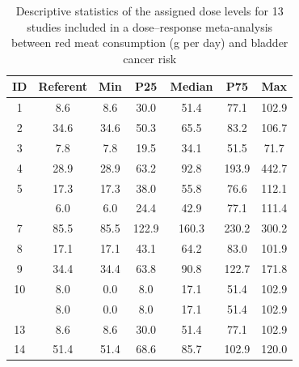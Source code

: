 \documentclass[11pt,a4paper,twoside,openany]{book}\usepackage{knitr}
\begin{document}
{\begin{knitrout}
\begin{table}[!h]
\caption{\label{tab:chr_redtab}Descriptive statistics of the assigned dose levels for 13 studies 
      included in a dose--response meta-analysis between red meat consumption (g per day) and bladder
      cancer risk}
\centering
\begin{tabular}[t]{ccccccc}
\toprule
ID & Referent & Min & P25 & Median & P75 & Max\\
\midrule
1 & 8.6 & 8.6 & 30.0 & 51.4 & 77.1 & 102.9\\
2 & 34.6 & 34.6 & 50.3 & 65.5 & 83.2 & 106.7\\
3 & 7.8 & 7.8 & 19.5 & 34.1 & 51.5 & 71.7\\
4 & 28.9 & 28.9 & 63.2 & 92.8 & 193.9 & 442.7\\
5 & 17.3 & 17.3 & 38.0 & 55.8 & 76.6 & 112.1\\
\addlinespace
6 & 6.0 & 6.0 & 24.4 & 42.9 & 77.1 & 111.4\\
7 & 85.5 & 85.5 & 122.9 & 160.3 & 230.2 & 300.2\\
8 & 17.1 & 17.1 & 43.1 & 64.2 & 83.0 & 101.9\\
9 & 34.4 & 34.4 & 63.8 & 90.8 & 122.7 & 171.8\\
10 & 8.0 & 0.0 & 8.0 & 17.1 & 51.4 & 102.9\\
\addlinespace
11 & 8.0 & 0.0 & 8.0 & 17.1 & 51.4 & 102.9\\
13 & 8.6 & 8.6 & 30.0 & 51.4 & 77.1 & 102.9\\
14 & 51.4 & 51.4 & 68.6 & 85.7 & 102.9 & 120.0\\
\bottomrule
\end{tabular}
\end{table}


\end{knitrout}


\begin{knitrout}\footnotesize
{}\color{fgcolor}\begin{table}


\end{table}
\end{knitrout}}
\end{document}
